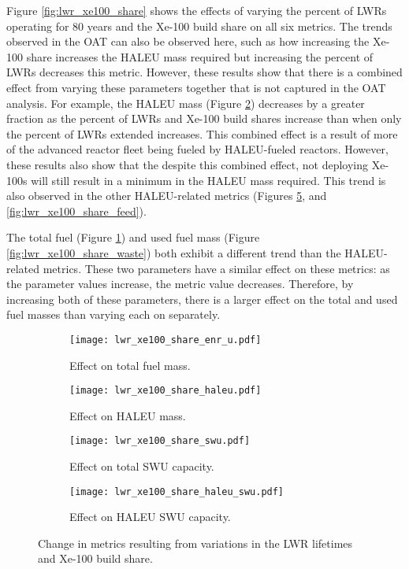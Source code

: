 Figure \ref{fig:lwr_xe100_share} shows the effects of varying the 
percent of \glspl{LWR} operating for 80 years and the Xe-100 
build share on all six metrics. The trends observed in the \gls{OAT} 
can also be observed here, such as how increasing the Xe-100 share 
increases the \gls{HALEU} mass required but increasing the 
percent of \glspl{LWR} decreases this metric. However, these results 
show that there is a combined effect from varying these parameters 
together that is not captured in the \gls{OAT} analysis. For 
example, the \gls{HALEU} mass (Figure \ref{fig:lwr_xe100_share_haleu}) 
decreases by a greater fraction 
as the percent of \glspl{LWR} and Xe-100 build shares increase than 
when only the percent of \glspl{LWR} extended increases. This combined 
effect is a result of more of the advanced reactor fleet being fueled 
by \gls{HALEU}-fueled reactors. However, these results also show that 
the despite this combined effect, not deploying Xe-100s will still
result in a minimum in the \gls{HALEU} mass required. This trend is also 
observed in the other \gls{HALEU}-related metrics (Figures \ref{fig:lwr_xe100_share_haleu_swu},
and \ref{fig:lwr_xe100_share_feed}). 

The total fuel (Figure \ref{fig:lwr_xe100_share_enr_u}) and used fuel 
mass (Figure \ref{fig:lwr_xe100_share_waste}) both exhibit a different trend 
than the \gls{HALEU}-related metrics. These two parameters have a similar 
effect on these metrics: as the parameter values increase, the metric value 
decreases. Therefore, by increasing both of these parameters, there is a 
larger effect on the total and used fuel masses than varying each on 
separately. 

\begin{figure}
    \begin{subfigure}[h!]{0.48\textwidth}
        \centering
        \texttt{[image: lwr\_xe100\_share\_enr\_u.pdf]}
        \caption{Effect on total fuel mass.}
        \label{fig:lwr_xe100_share_enr_u}
    \end{subfigure}
    \hfill
    \begin{subfigure}[h!]{0.48\textwidth}
        \centering
        \texttt{[image: lwr\_xe100\_share\_haleu.pdf]}
        \caption{Effect on HALEU mass.}
        \label{fig:lwr_xe100_share_haleu}
    \end{subfigure}  
    \begin{subfigure}[h!]{0.48\textwidth}
        \centering
        \texttt{[image: lwr\_xe100\_share\_swu.pdf]}
        \caption{Effect on total SWU capacity.}
        \label{fig:lwr_xe100_share_swu}
    \end{subfigure}
    \hfill
    \begin{subfigure}[h!]{0.48\textwidth}
        \centering
        \texttt{[image: lwr\_xe100\_share\_haleu\_swu.pdf]}
        \caption{Effect on HALEU SWU capacity.}
        \label{fig:lwr_xe100_share_haleu_swu}
    \end{subfigure}
    \caption{Change in metrics resulting from variations in the 
    LWR lifetimes and Xe-100 build share.}
\end{figure}

